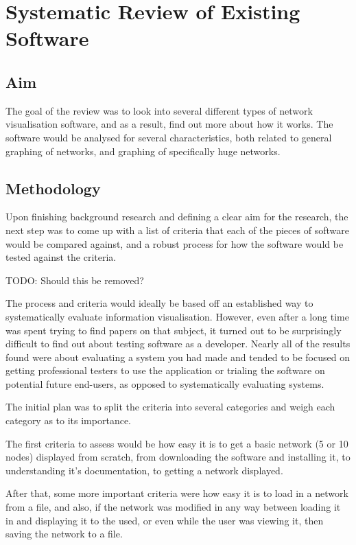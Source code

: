 \documentclass[../dissertation.tex]{subfiles}
\begin{document}
\chapter{Systematic Review of Existing Software}
\label{sec:systematic-review}

\section{Aim} 

The goal of the review was to look into several different types of network visualisation software, and as a result, find out more about how it works. The software would be analysed for several characteristics, both related to general graphing of networks, and graphing of specifically huge networks.

\section{Methodology}

Upon finishing background research and defining a clear aim for the research, the next step was to come up with a list of criteria that each of the pieces of software would be compared against, and a robust process for how the software would be tested against the criteria. 

TODO: Should this be removed?

The process and criteria would ideally be based off an established way to systematically evaluate information visualisation. However, even after a long time was spent trying to find papers on that subject, it turned out to be surprisingly difficult to find out about testing software as a developer. Nearly all of the results found were about evaluating a system you had made and tended to be focused on getting professional testers to use the application or trialing the software on potential future end-users, as opposed to systematically evaluating systems.

The initial plan was to split the criteria into several categories and weigh each category as to its importance. 

The first criteria to assess would be how easy it is to get a basic network (5 or 10 nodes) displayed from scratch, from downloading the software and installing it, to understanding it's documentation, to getting a network displayed. 

After that, some more important criteria were how easy it is to load in a network from a file, and also, if the network was modified in any way between loading it in and displaying it to the used, or even while the user was viewing it, then saving the network to a file. 
\end{document}
